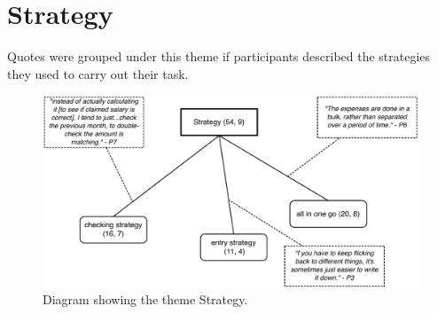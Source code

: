 \clearpage
\section{Strategy}
Quotes were grouped under this theme if participants described the strategies they used to carry out their task.  

\begin{figure}[!ht]
\centering
\includegraphics[width=\textwidth]{images/ch12/Strategy.pdf}
\caption[Study 1 Strategy diagram]{Diagram showing the theme Strategy.}
\vspace{-9pt}
\label{fig:ch3_strategy}
\end{figure}

